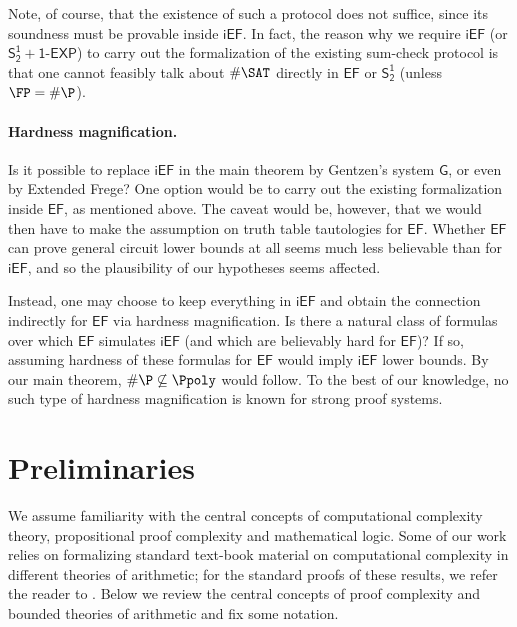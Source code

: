 \documentclass[11pt]{article}
\newcommand{\SOT}{\mathsf{S^1_2}}
\newcommand{\SOTEXP}{\mathsf{S^1_2} + \mathsf{1\textsf{-}EXP}}
\newcommand{\EF}{\mathsf{EF}}
\newcommand{\Gent}{\mathsf{G}}
\newcommand{\iEF}{\mathsf{iEF}}
\theoremstyle{definition}
\theoremstyle{plain}
\theoremstyle{remark}
\begin{document}
Note, of course, that the existence of such a protocol does not suffice, since its soundness must be provable inside $\iEF$. In fact, the reason why we require $\iEF$ (or $\SOTEXP$) to carry out the formalization of the existing sum-check protocol is that one cannot feasibly talk about $\#\SAT$ directly in $\EF$ or $\SOT$  (unless $\FP = \#\P$).

\paragraph{Hardness magnification.} Is it possible to replace $\iEF$ in the main theorem by Gentzen's system $\Gent$, or even by Extended Frege? One option would be to carry out the existing formalization inside $\EF$, as mentioned above. The caveat would be, however, that we would then have to make the assumption on truth table tautologies for $\EF$. Whether $\EF$ can prove general circuit lower bounds at all seems much less believable than for $\iEF$, and so the plausibility of our hypotheses seems affected.

Instead, one may choose to keep everything in $\iEF$ and obtain the connection indirectly for $\EF$ via hardness magnification. Is there a natural class of formulas over which $\EF$ simulates $\iEF$ (and which are believably hard for $\EF$)? If so, assuming hardness of these formulas for $\EF$ would imply $\iEF$ lower bounds. By our main theorem, $\#\P \not\subseteq \Ppoly$ would follow. To the best of our knowledge, no such type of hardness magnification is known for strong proof systems.

\section{Preliminaries}
\label{sec:preliminaries}
We assume familiarity with the central concepts of computational complexity theory, propositional proof complexity and mathematical logic. Some of our work relies on formalizing standard text-book material on computational complexity in different theories of arithmetic; for the standard proofs of these results, we refer the reader to \citeauthor{AB09} \cite{AB09}. Below we review the central concepts of proof complexity and bounded theories of arithmetic and fix some notation.
\end{document}
